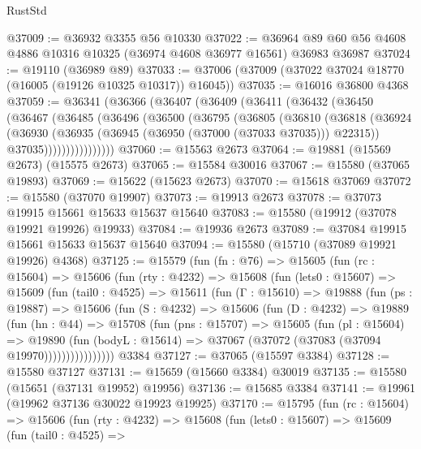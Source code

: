 \begin{lexlean}{RustStd}
\begin{coremodule}
@37009 := @36932 @3355 @56 @10330
@37022 := @36964 @89 @60 @56 @4608 @4886 @10316 @10325 (@36974 @4608 @36977 @16561) @36983 @36987
@37024 := @19110 (@36989 @89)
@37033 := @37006 (@37009 (@37022 @37024 @18770 (@16005 (@19126 @10325 @10317)) @16045))
@37035 := @16016 @36800 @4368
@37059 := @36341
    (@36366
      (@36407
        (@36409
          (@36411
            (@36432
              (@36450
                (@36467
                  (@36485
                    (@36496
                      (@36500
                        (@36795
                          (@36805
                            (@36810
                              (@36818
                                (@36924
                                  (@36930
                                    (@36935 (@36945 (@36950 (@37000 (@37033 @37035))) @22315))
                                    @37035))))))))))))))))
@37060 := @15563 @2673
@37064 := @19881 (@15569 @2673) (@15575 @2673)
@37065 := @15584 @30016
@37067 := @15580 (@37065 @19893)
@37069 := @15622 (@15623 @2673)
@37070 := @15618 @37069
@37072 := @15580 (@37070 @19907)
@37073 := @19913 @2673
@37078 := @37073 @19915 @15661 @15633 @15637 @15640
@37083 := @15580 (@19912 (@37078 @19921 @19926) @19933)
@37084 := @19936 @2673
@37089 := @37084 @19915 @15661 @15633 @15637 @15640
@37094 := @15580 (@15710 (@37089 @19921 @19926) @4368)
@37125 := @15579
    (fun (fn : @76) =>
    @15605
      (fun (rc : @15604) =>
      @15606
        (fun (rty : @4232) =>
        @15608
          (fun (lets0 : @15607) =>
          @15609
            (fun (tail0 : @4525) =>
            @15611
              (fun (Γ : @15610) =>
              @19888
                (fun (ps : @19887) =>
                @15606
                  (fun (S : @4232) =>
                  @15606
                    (fun (D : @4232) =>
                    @19889
                      (fun (hn : @44) =>
                      @15708
                        (fun (pns : @15707) =>
                        @15605
                          (fun (pl : @15604) =>
                          @19890
                            (fun (bodyL : @15614) =>
                            @37067 (@37072 (@37083 (@37094 @19970))))))))))))))))
    @3384
@37127 := @37065 (@15597 @3384)
@37128 := @15580 @37127
@37131 := @15659 (@15660 @3384) @30019
@37135 := @15580 (@15651 (@37131 @19952) @19956)
@37136 := @15685 @3384
@37141 := @19961 (@19962 @37136 @30022 @19923 @19925)
@37170 := @15795
    (fun (rc : @15604) =>
    @15606
      (fun (rty : @4232) =>
      @15608
        (fun (lets0 : @15607) =>
        @15609
          (fun (tail0 : @4525) =>

\end{coremodule}
\end{lexlean}

